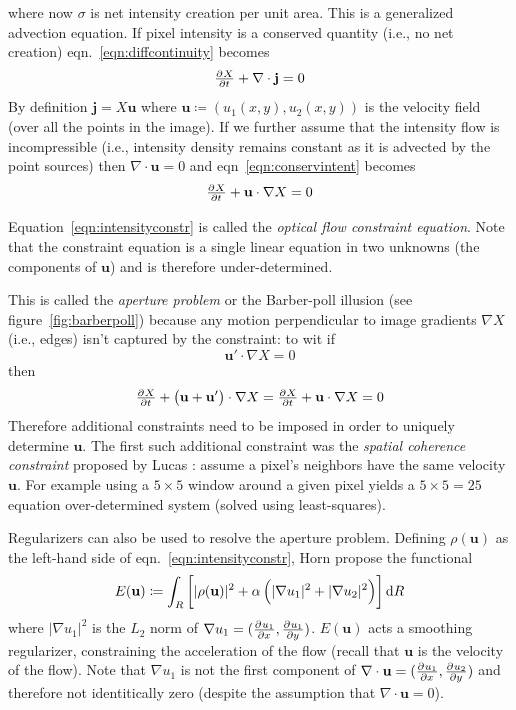 where now \(\sigma\) is net intensity creation per unit area.
%
This is a generalized advection equation.
%
If pixel intensity is a conserved quantity (i.e., no net creation) eqn.~\eqref{eqn:diffcontinuity} becomes
\begin{equation}
	\pd{X}{t} + \nabla \cdot \mathbf{j} = 0
	\label{eqn:conservintent}
\end{equation}
By definition \(\mathbf{j} = X\mathbf{u}\) where \(\mathbf{u} \coloneqq (u_1(x,y), u_2(x,y))\) is the velocity field (over all the points in the image).
%
If we further assume that the intensity flow is incompressible (i.e., intensity density remains constant as it is advected by the point sources) then \(\nabla \cdot \mathbf{u} = 0\) and eqn~\eqref{eqn:conservintent} becomes
\begin{equation}
	\pd{X}{t} + \mathbf{u} \cdot \nabla X = 0
	\label{eqn:intensityconstr}
\end{equation}

Equation~\eqref{eqn:intensityconstr} is called the \textit{optical flow constraint equation}\cite{perez2013tv}.
%
Note that the constraint equation is a single linear equation in two unknowns (the components of \(\mathbf{u}\)) and is therefore under-determined.
%

%
This is called the \textit{aperture problem} or the Barber-poll illusion (see figure~\ref{fig:barberpoll}) because any motion perpendicular to image gradients \(\nabla X\) (i.e., edges) isn't captured by the constraint: to wit if 
\[\mathbf{u}' \cdot \nabla X= 0\] 
then 
\[
	\pd{X}{t} + \left(\mathbf{u} + \mathbf{u}' \right) \cdot \nabla X = \pd{X}{t} + \mathbf{u} \cdot \nabla X = 0
\]
%
Therefore additional constraints need to be imposed in order to uniquely determine \(\mathbf{u}\).
%
The first such additional constraint was the \textit{spatial coherence constraint} proposed by Lucas \etal\cite{lucas1981iterative}: assume a pixel's neighbors have the same velocity \(\mathbf{u}\).
%
For example using a \(5 \times 5\) window around a given pixel yields a \(5\times5 = 25\) equation over-determined system (solved using least-squares).

Regularizers can also be used to resolve the aperture problem. 
%
Defining \(\rho(\mathbf{u})\) as the left-hand side of eqn.~\eqref{eqn:intensityconstr}, Horn \etal\cite{horn1993determining} propose the functional
\begin{equation}
	E(\mathbf{u}) \coloneqq \int_R \left[ |\rho(\mathbf{u})|^2 + \alpha \left( | \nabla u_1 |^2 + | \nabla u_2 |^2\right) \right] \dif R
	\label{eqn:linearhorn}
\end{equation}
where \(| \nabla u_1 |^2\) is the \(L_2\) norm of \(\nabla u_1 = (\pd{u_1}{x}, \pd{u_1}{y})\).
%
\(E(\mathbf{u})\) acts a smoothing regularizer, constraining the acceleration of the flow (recall that \(\mathbf{u}\) is the velocity of the flow).
%
Note that \(\nabla u_1\) is not the first component of \(\nabla \cdot \mathbf{u} = (\pd{u_1}{x}, \pd{u_2}{y})\) and therefore not identitically zero (despite the assumption that  \(\nabla \cdot \mathbf{u} = 0\)).

